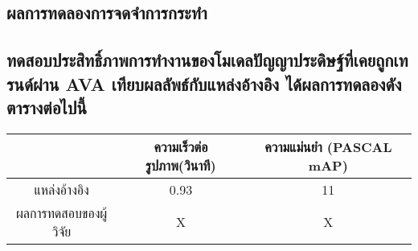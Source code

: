 \subsection*{ผลการทดลองการจดจำการกระทำ}
\subsection{ทดสอบประสิทธิ์ภาพการทำงานของโมเดลปัญญาประดิษฐ์ที่เคยถูกเทรนด์ผ่าน AVA เทียบผลลัพธ์กับแหล่งอ้างอิง ได้ผลการทดลองดังตารางต่อไปนี้}
\begin{tabular}{|c|c|c|}
		\hline
		{}&{ความเร็วต่อรูปภาพ(วินาที)}&{ความแม่นยำ (PASCAL mAP)}			\\
		\hline
		แหล่งอ้างอิง	 					& 0.93		& 11														\\
		ผลการทดสอบของผู้วิจัย				& X			& X				\\
		\hline
\end{tabular}
